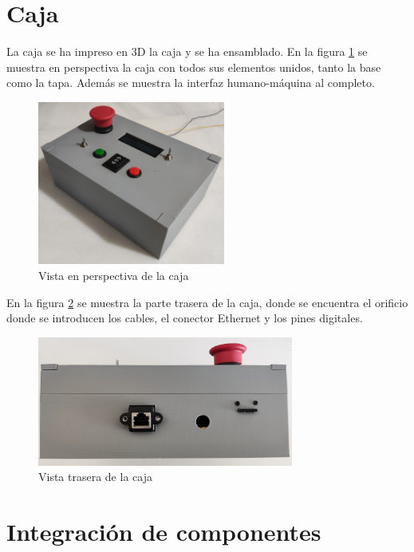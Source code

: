 \section{Caja}

La caja se ha impreso en 3D la caja y se ha ensamblado. En la figura \ref{fig:cajaexterior}
se muestra en perspectiva la caja con todos sus elementos unidos, tanto la base como la tapa. 
Además se muestra la interfaz humano-máquina al completo.

\begin{figure}[hbtp]%
    \centering 
        \includegraphics[width=0.55\textwidth]{07-resultados/cajaexterior.jpg}
    \caption{Vista en perspectiva de la caja}
    \label{fig:cajaexterior} 
\end{figure}

En la figura \ref{fig:cajatrasero} se muestra la parte trasera de la caja, donde se encuentra
el orificio donde se introducen los cables, el conector Ethernet y los pines digitales.

\begin{figure}[hbtp]%
    \centering 
        \includegraphics[width=0.75\textwidth]{07-resultados/cajatrasero.jpg}
    \caption{Vista trasera de la caja}
    \label{fig:cajatrasero} 
\end{figure}



\section{Integración de componentes}

